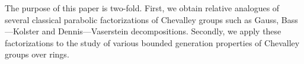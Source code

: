 \documentclass[12pt]{amsart}
\theoremstyle{plain}
\numberwithin{equation}{section}
\numberwithin{lemma}{section}
\theoremstyle{definition}
\theoremstyle{remark}
\DeclareMathOperator{\G}{G}
\DeclareMathOperator{\E}{E}
\DeclareMathOperator{\EP}{EP}
\DeclareMathOperator{\Par}{P}
\DeclareMathOperator{\B}{B}
\DeclareMathOperator{\U}{U}
\begin{document}
The purpose of this paper is two-fold. 
First, we obtain relative analogues of several classical parabolic factorizations of Chevalley groups such as Gauss, Bass---Kolster and Dennis---Vaserstein decompositions.
Secondly, we apply these factorizations to the study of various bounded generation properties of Chevalley groups over rings.

\end{document}
